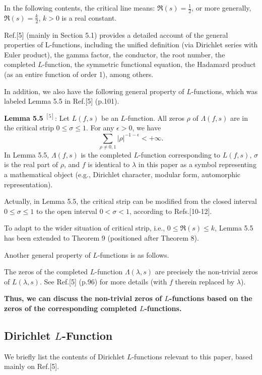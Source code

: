 \documentclass[12pt]{article}
\begin{document}
In the following contents, the critical line means: $\mathfrak{R}(s)=\frac{1}{2}$, or more generally, $\mathfrak{R}(s)=\frac{k}{2}$, $k > 0$ is a real constant.

Ref.[5] (mainly in Section 5.1) provides a detailed account of the general properties of L-functions, including the unified definition (via Dirichlet series with Euler product), the gamma factor, the conductor, the root number, the completed \( L \)-function, the symmetric functional equation, the Hadamard product (as an entire function of order 1), among others.

In addition, we also have the following general property of \( L \)-functions, which was labeled Lemma 5.5 in Ref.[5] (p.101).

\textbf{Lemma 5.5 }$^{[5]}$:
Let \( L(f,s) \) be an \( L \)-function. All zeros \( \rho \) of \( \Lambda(f,s) \) are in the critical strip \( 0 \leq \sigma \leq 1 \). For any \( \epsilon > 0 \), we have
\[
\sum_{\rho \neq 0,1} |\rho|^{-1-\epsilon} < +\infty.
\]
In Lemma 5.5, \( \Lambda(f,s) \) is the completed \( L \)-function corresponding to \( L(f,s) \), $\sigma$ is the real part of \( \rho \), and $f$ is identical to $\lambda$ in this paper as a symbol representing a mathematical object (e.g., Dirichlet character, modular form, automorphic representation).

Actually, in Lemma 5.5, the critical strip can be modified from the closed interval \( 0 \leq \sigma \leq 1 \) to the open interval \( 0 < \sigma < 1 \), according to Refs.[10-12].

To adapt to the wider situation of critical strip, i.e., $0 \leq \Re(s) \leq k$, Lemma 5.5 has been extended to Theorem 9 (positioned after Theorem 8).

Another general property of \( L \)-functions is as follows.

The zeros of the completed $L$-function $\Lambda(\lambda, s)$ are precisely the non-trivial zeros of $L(\lambda, s)$. See Ref.[5] (p.96) for more details (with $f$ therein replaced by $\lambda$).

\textbf{Thus, we can discuss the non-trivial zeros of $L$-functions based on the zeros of the corresponding completed $L$-functions.}

\subsection{Dirichlet $L$-Function}
We briefly list the contents of Dirichlet $L$-functions relevant to this paper, based mainly on Ref.[5].
\end{document}
